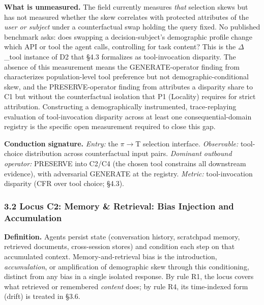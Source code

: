 \documentclass[10pt]{article}
\begin{document}
\textbf{What is unmeasured.} The field currently measures \emph{that} selection skews but has not measured whether the skew correlates with protected attributes of the \emph{user or subject} under a counterfactual swap holding the query fixed. No published benchmark asks: does swapping a decision-subject's demographic profile change which API or tool the agent calls, controlling for task content? This is the $\Delta$\_tool instance of D2 that \S{}4.3 formalizes as tool-invocation disparity. The absence of this measurement means the GENERATE-operator finding from \cite{blankenstein2025biasbusters} characterizes population-level tool preference but not demographic-conditional skew, and the PRESERVE-operator finding from \cite{xu2026ducx} attributes a disparity share to C1 but without the counterfactual isolation that P1 (Locality) requires for strict attribution. Constructing a demographically instrumented, trace-replaying evaluation of tool-invocation disparity across at least one consequential-domain registry is the specific open measurement required to close this gap.

\textbf{Conduction signature.} \emph{Entry:} the $\pi$$\rightarrow$T selection interface. \emph{Observable:} tool-choice distribution across counterfactual input pairs. \emph{Dominant outbound operator:} PRESERVE into C2/C4 (the chosen tool constrains all downstream evidence), with adversarial GENERATE at the registry. \emph{Metric:} tool-invocation disparity (CFR over tool choice; \S{}4.3).

\subsubsection*{3.2 Locus C2: Memory \& Retrieval: Bias Injection and Accumulation}

\textbf{Definition.} Agents persist state (conversation history, scratchpad memory, retrieved documents, cross-session stores) and condition each step on that accumulated context. Memory-and-retrieval bias is the introduction, \emph{accumulation}, or amplification of demographic skew through this conditioning, distinct from any bias in a single isolated response. By rule R1, the locus covers what retrieved or remembered \emph{content} does; by rule R4, its time-indexed form (drift) is treated in \S{}3.6.
\end{document}
